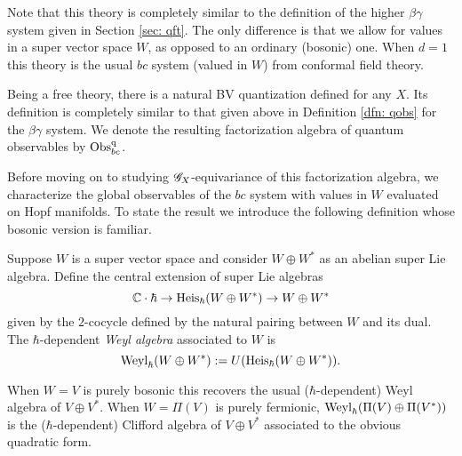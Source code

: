 \begin{rmk}
Note that this theory is completely similar to the definition of the higher $\beta\gamma$ system given in Section \ref{sec: qft}. 
The only difference is that we allow for values in a super vector space $W$, as opposed to an ordinary (bosonic) one. 
When $d=1$ this theory is the usual $bc$ system (valued in $W$) from conformal field theory.
\end{rmk}

Being a free theory, there is a natural BV quantization defined for any $X$.
Its definition is completely similar to that given above in Definition \ref{dfn: qobs} for the $\beta\gamma$ system. 
We denote the resulting factorization algebra of quantum observables by ${\rm Obs}^{\rm q}_{bc}$. 

Before moving on to studying $\mathscr G_X$-equivariance of this factorization algebra, we characterize the global observables of the $bc$ system with values in $W$ evaluated on Hopf manifolds. 
To state the result we introduce the following definition whose bosonic version is familiar. 

\begin{dfn}
Suppose $W$ is a super vector space and consider $W \oplus W^*$ as an abelian super Lie algebra. 
Define the central extension of super Lie algebras
\[
\mathbb C \cdot \hbar \to {\rm Heis}_\hbar (W \oplus W^*) \to W \oplus W^*
\]
given by the $2$-cocycle defined by the natural pairing between $W$ and its dual. 
The $\hbar$-dependent {\em Weyl algebra} associated to $W$ is
\[
{\rm Weyl}_\hbar(W \oplus W^*) := U({\rm Heis}_\hbar(W \oplus W^*)) .
\]
\end{dfn}

\begin{rmk}
When $W = V$ is purely bosonic this recovers the usual ($\hbar$-dependent) Weyl algebra of $V \oplus V^*$. 
When $W = \Pi(V)$ is purely fermionic, ${\rm Weyl}_\hbar(\Pi(V) \oplus \Pi(V^*))$ is the ($\hbar$-dependent) Clifford algebra of $V\oplus V^*$ associated to the obvious quadratic form.  
\end{rmk} 

